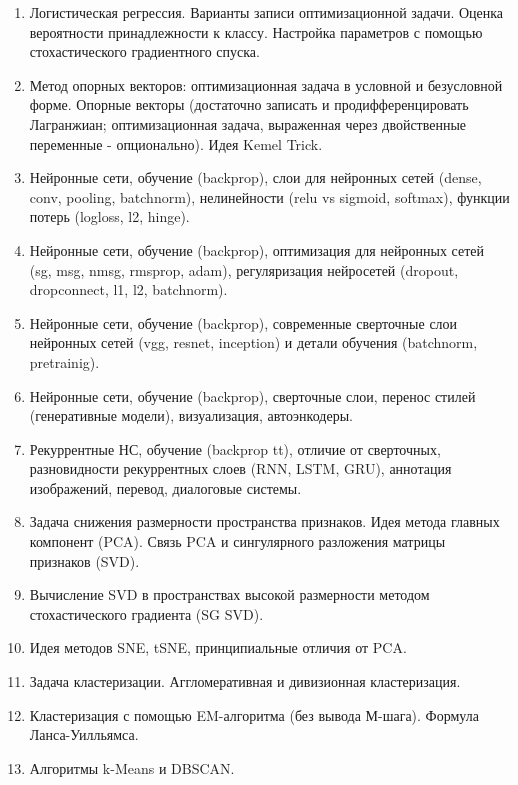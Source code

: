 \documentclass[15pt]{article}
\begin{document}
\begin{enumerate}
  \item Логистическая регрессия. Варианты записи оптимизационной задачи.
      Оценка вероятности принадлежности к классу.
      Настройка параметров с помощью стохастического градиентного спуска.

  \item Метод опорных векторов: оптимизационная задача в условной и безусловной форме.
      Опорные векторы (достаточно записать и продифференцировать Лагранжиан; оптимизационная задача, выраженная через двойственные переменные - опционально).
      Идея Kemel Trick.

  \item Нейронные сети, обучение (backprop), слои для нейронных сетей (dense, conv, pooling, batchnorm), нелинейности (relu vs sigmoid, softmax), функции потерь (logloss, l2, hinge).

  \item Нейронные сети, обучение (backprop), оптимизация для нейронных сетей (sg, msg, nmsg, rmsprop, adam), регуляризация нейросетей (dropout, dropconnect, l1, l2, batchnorm).

  \item Нейронные сети, обучение (backprop), современные сверточные слои нейронных сетей (vgg, resnet, inception) и детали обучения (batchnorm, pretrainig).

  \item Нейронные сети, обучение (backprop), сверточные слои, перенос стилей (генеративные модели), визуализация, автоэнкодеры.

  \item Рекуррентные НС, обучение (backprop tt), отличие от сверточных, разновидности рекуррентных слоев (RNN, LSTM, GRU), аннотация изображений, перевод, диалоговые системы.

  \item Задача снижения размерности пространства признаков.
      Идея метода главных компонент (PCA).
      Связь PCA и сингулярного разложения матрицы признаков (SVD).

  \item Вычисление SVD в пространствах высокой размерности методом стохастического градиента (SG SVD).

  \item Идея методов SNE, tSNE, принципиальные отличия от PCA.

  \item Задача кластеризации. Аггломеративная и дивизионная кластеризация.

  \item Кластеризация с помощью EM-алгоритма (без вывода М-шага).
      Формула Ланса-Уилльямса.
      
  \item Алгоритмы k-Means и DBSCAN.
  
  
\end{enumerate}
\end{document}
